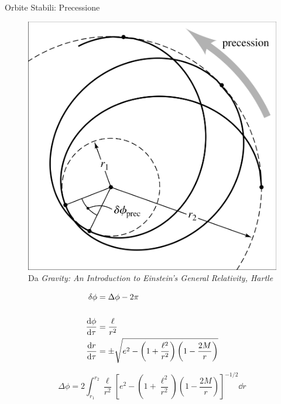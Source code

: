 \begin{frame}{Orbite Stabili: Precessione}

    \begin{minipage}{0.4 \textwidth}
        \begin{figure}
            \centering
            \includegraphics[width= 0.9 \textwidth]{Figures/ch1/precession_bozza.png}
            \caption{Da \textit{Gravity: An Introduction to Einstein's General Relativity, Hartle}}
        \end{figure}
    \end{minipage}
    \begin{minipage}{0.6 \textwidth}
        \begin{align*}
            \delta \phi &= \Delta \phi - 2 \pi \\ \\
            \dv{\phi}{\tau} &= \frac{\ell}{r^2} \\
            \dv{r}{\tau} &= \pm \sqrt{e^2 - \left(1 + \frac{\ell^2}{r^2}\right)
            \left(1 - \frac{2M}{r}\right)}
        \end{align*}
    \end{minipage}

    \begin{equation*}
        \Delta \phi = 2 \int_{r_1}^{r_2} \frac{\ell}{r^2}
        \left[e^2 - \left(1 + \frac{\ell^2}{r^2}\right)
        \left(1 - \frac{2M}{r}\right)\right]^{-1/2} \dd r
    \end{equation*}

\end{frame}


